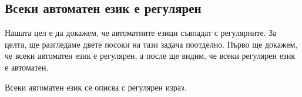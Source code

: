 \subsection{Всеки автоматен език е регулярен}

Нашата цел е да докажем, че автоматните езици съвпадат с регулярните.
За целта, ще разгледаме двете посоки на тази задача поотделно.
Първо ще докажем, че всеки автоматен език е регулярен, а после ще видим, че всеки регулярен език е автоматен.

\begin{important}
\begin{theorem}
  \label{th:regular:kleene}
  Всеки автоматен език се описва с регулярен израз.
\end{theorem}
\end{important}
